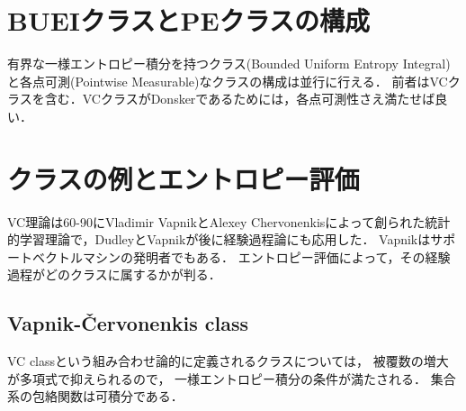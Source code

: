 \documentclass[uplatex,dvipdfmx]{jsreport}
\begin{document}
\section{BUEIクラスとPEクラスの構成}

\begin{tcolorbox}[colframe=ForestGreen, colback=ForestGreen!10!white,breakable,colbacktitle=ForestGreen!40!white,coltitle=black,fonttitle=\bfseries\sffamily,
title=]
    有界な一様エントロピー積分を持つクラス(Bounded Uniform Entropy Integral)と各点可測(Pointwise Measurable)なクラスの構成は並行に行える．
    前者はVCクラスを含む．VCクラスがDonskerであるためには，各点可測性さえ満たせば良い．
\end{tcolorbox}

\section{クラスの例とエントロピー評価}

\begin{tcolorbox}[colframe=ForestGreen, colback=ForestGreen!10!white,breakable,colbacktitle=ForestGreen!40!white,coltitle=black,fonttitle=\bfseries\sffamily,
title=]
    VC理論は60-90にVladimir VapnikとAlexey Chervonenkisによって創られた統計的学習理論で，DudleyとVapnikが後に経験過程論にも応用した．
    Vapnikはサポートベクトルマシンの発明者でもある．
    エントロピー評価によって，その経験過程がどのクラスに属するかが判る．
\end{tcolorbox}

\subsection{Vapnik-\v{C}ervonenkis class}

\begin{tcolorbox}[colframe=ForestGreen, colback=ForestGreen!10!white,breakable,colbacktitle=ForestGreen!40!white,coltitle=black,fonttitle=\bfseries\sffamily,
title=]
    VC classという組み合わせ論的に定義されるクラスについては，
    被覆数の増大が多項式で抑えられるので，
    一様エントロピー積分の条件が満たされる．
    集合系の包絡関数は可積分である．
\end{tcolorbox}
\end{document}
